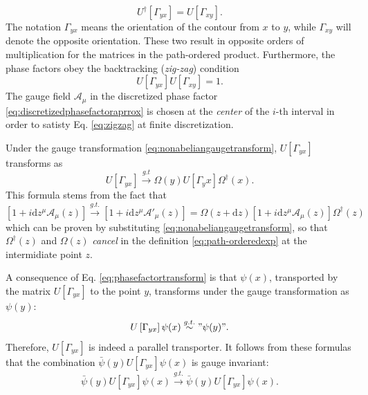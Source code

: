 \begin{equation}
  U^\dagger\left[\Gamma_{yx}\right] = U\left[\Gamma_{xy}\right].
\end{equation}
The notation $\Gamma_{yx}$ means the orientation of the contour from $x$ to
$y$, while $\Gamma_{xy}$ will denote the opposite orientation. These two result
in opposite orders of multiplication for the matrices in the path-ordered
product. Furthermore, the phase factors obey the backtracking
(\textit{zig-zag}) condition
\begin{equation}
  U\left[\Gamma_{yx}\right]U\left[\Gamma_{xy}\right] = 1.
  \label{eq:zigzag}
\end{equation}
The gauge field $\mathcal{A}_\mu$ in the discretized phase factor
\eqref{eq:discretizedphasefactoraprrox} is chosen at the \textit{center} of the
$i$-th interval in order to satisty Eq. \eqref{eq:zigzag} at finite
discretization.
\par Under the gauge transformation \eqref{eq:nonabeliangaugetransform},
$U\left[\Gamma_{yx}\right]$ transforms as
\begin{equation}
  U\left[\Gamma_{yx}\right]\xrightarrow{g.t}\Omega(y)U\left[\Gamma_yx\right]\Omega^\dagger(x).
  \label{eq:phasefactortransform}
\end{equation}
This formula stems from the fact that
\begin{equation}
  \left[1+i\mathrm{d}z^\mu\mathcal{A}_\mu(z)\right]\xrightarrow{g.t.}\left[1+i\mathrm{d}z^\mu\mathcal{A}'_\mu(z)\right]=\Omega(z+\mathrm{d}z)\left[1+i\mathrm{d}z^\mu\mathcal{A}_\mu(z)\right]\Omega^\dagger(z)
\end{equation}
which can be proven by substituting \eqref{eq:nonabeliangaugetransform}, so
that $\Omega^\dagger(z)$ and $\Omega(z)$ \textit{cancel} in the definition
\eqref{eq:path-orderedexp} at the intermidiate point $z$.
\par A consequence of Eq. \eqref{eq:phasefactortransform} is that $\psi(x)$,
transported by the matrix $U\left[\Gamma_{yx}\right]$ to the point $y$,
transforms under the gauge transformation as $\psi(y)$:
\begin{equation}
  U\left[\Gamma_{yx}\right]\psi(x)\stackrel{g.t.}{\sim}"\psi(y)".
\end{equation}
Therefore, $U\left[\Gamma_{yx}\right]$ is indeed a parallel transporter.
It follows from these formulas that the combination
$\bar{\psi}(y)U\left[\Gamma_{yx}\right]\psi(x)$ is gauge invariant:
\begin{equation}
  \bar{\psi}(y)U\left[\Gamma_{yx}\right]\psi(x)\xrightarrow{g.t.}\bar{\psi}(y)U\left[\Gamma_{yx}\right]\psi(x).
\end{equation}
